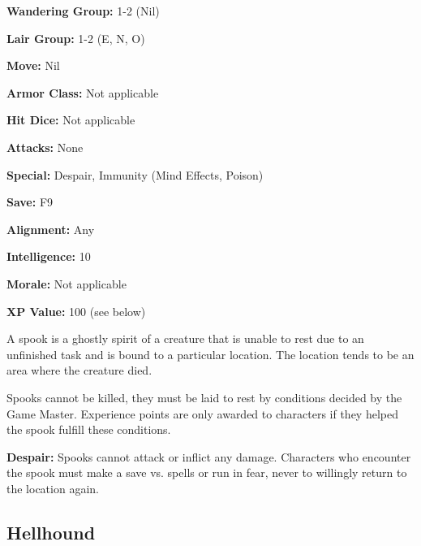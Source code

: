 \begin{multicols*}{2}
{\textbf{Wandering Group:} 1-2 (Nil)

\textbf{Lair Group:} 1-2 (E, N, O)

\textbf{Move:} Nil

\textbf{Armor Class:} Not applicable

\textbf{Hit Dice:} Not applicable

\textbf{Attacks:} None

\textbf{Special:} Despair, Immunity (Mind Effects, Poison)

\textbf{Save:} F9

\textbf{Alignment:} Any

\textbf{Intelligence:} 10

\textbf{Morale:} Not applicable

\textbf{XP Value:} 100 (see below)}

A spook is a ghostly spirit of a creature that is unable to rest due to an unfinished task and is bound to a particular location. The location tends to be an area where the creature died.

Spooks cannot be killed, they must be laid to rest by conditions decided by the Game Master. Experience points are only awarded to characters if they helped the spook fulfill these conditions.

\textbf{Despair:} Spooks cannot attack or inflict any damage. Characters who encounter the spook must make a save vs. spells or run in fear, never to willingly return to the location again.

\subsection{Hellhound}
\end{multicols*}
